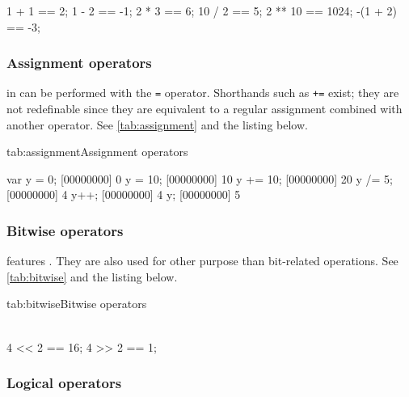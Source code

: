 \begin{urbiassert}
   1 + 1 ==    2;
   1 - 2 ==   -1;
   2 * 3 ==    6;
  10 / 2 ==    5;
 2 ** 10 == 1024;
-(1 + 2) ==   -3;
\end{urbiassert}

\subsubsection{Assignment operators}

 in \us can be performed with the \lstinline|=|
operator.  Shorthands such as \lstinline|+=| exist; they are not
redefinable since they are equivalent to a regular assignment combined
with another operator. See \autoref{tab:assignment} and the listing
below.


\begin{operatorTable}{tab:assignment}{Assignment operators}
  \operatorass[\footnotemark]\\
  \operatorsiass
\end{operatorTable}



\begin{urbiscript}
var y = 0;
[00000000] 0
y = 10;
[00000000] 10
y += 10;
[00000000] 20
y /= 5;
[00000000] 4
y++;
[00000000] 4
y;
[00000000] 5
\end{urbiscript}

\subsubsection{Bitwise operators}

\us features .  They are also used for other
purpose than bit-related operations. See \autoref{tab:bitwise} and the
listing below.

\begin{operatorTable}{tab:bitwise}{Bitwise operators}
  \operatorlshift\\
  \operatorrshift\\
  \hline
  \operatorbxor
\end{operatorTable}

\begin{urbiassert}
4 << 2 == 16;
4 >> 2 ==  1;
\end{urbiassert}

\subsubsection{Logical operators}

